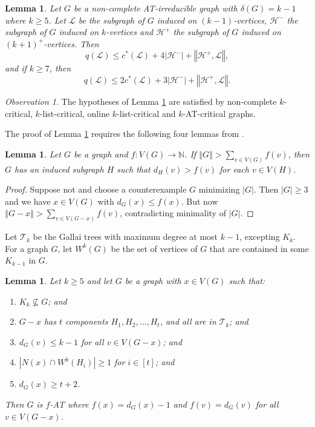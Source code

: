 \documentclass[10pt]{article}
\theoremstyle{plain}
\newtheorem{lem}[thm]{Lemma}
\theoremstyle{definition}
\theoremstyle{remark}
\newtheorem*{observation}{Observation}
\newcommand{\fancy}[1]{\mathcal{#1}}
\newcommand{\IN}{\mathbb{N}}
\newcommand{\T}{\fancy{T}}
\renewcommand{\L}{\fancy{L}}
\newcommand{\HH}{\fancy{H}}
\newcommand{\card}[1]{\left|#1\right|}
\newcommand{\size}[1]{\left\Vert#1\right\Vert}
\newcommand{\func}[3]{#1\colon #2 \rightarrow #3}
\newcommand{\irange}[1]{\left[#1\right]}
\begin{document}
\begin{lem}\label{qLemma}
	Let $G$ be a non-complete AT-irreducible graph with $\delta(G) = k-1$ where $k \ge 5$.  Let $\L$ be the subgraph of $G$ induced on $(k-1)$-vertices, $\HH^-$ the subgraph of $G$ induced on $k$-vertices and 
	$\HH^+$ the subgraph of $G$ induced on $(k+1)^+$-vertices.  Then
	\[q(\L) \le c^*(\L) + 4\card{\HH^-} + \size{\HH^+, \L},\] and if $k \ge 7$, then
	\[q(\L) \le 2c^*(\L) + 3\card{\HH^-} + \size{\HH^+, \L}.\]
\end{lem}

\begin{observation}
The hypotheses of Lemma \ref{qLemma} are satisfied by non-complete $k$-critical, $k$-list-critical, online $k$-list-critical and $k$-AT-critical graphs.
\end{observation}

The proof of Lemma \ref{qLemma} requires the following four lemmas from \cite{OreVizing}.

\begin{lem}\label{DegenerateEuler}
Let $G$ be a graph and $\func{f}{V(G)}{\IN}$.  If $\size{G} > \sum_{v \in V(G)} f(v)$, then $G$ has an induced subgraph $H$ such that $d_H(v) > f(v)$ for each $v \in V(H)$.
\end{lem}
\begin{proof}
Suppose not and choose a counterexample $G$ minimizing $\card{G}$. Then $\card{G} \ge 3$ and we have $x \in V(G)$ with $d_G(x) \leq f(x)$. But now $\size{G-x} > \sum_{v \in V(G-x)} f(v)$, contradicting minimality of $\card{G}$.
\end{proof}

Let $\T_k$ be the Gallai trees with maximum degree at most $k-1$, excepting $K_k$. For a graph $G$, let $W^k(G)$ be the set of vertices of $G$ that are contained in some $K_{k-1}$ in $G$.  

\begin{lem}\label{ConfigurationTypeOneEuler}
Let $k \ge 5$ and let $G$ be a graph with $x \in V(G)$ such that:
\begin{enumerate}
\item $K_k \not \subseteq G$; and
\item $G-x$ has $t$ components $H_1, H_2, \ldots, H_t$, and all are in $\T_k$; and
\item $d_G(v) \leq k - 1$ for all $v \in V(G-x)$; and
\item $\card{N(x) \cap W^k(H_i)} \ge 1$ for $i \in \irange{t}$; and
\item $d_G(x) \ge t+2$.
\end{enumerate}

\noindent Then $G$ is $f$-AT where $f(x) = d_G(x) - 1$ and $f(v) = d_G(v)$ for all $v \in V(G - x)$.
\end{lem}
\end{document}
